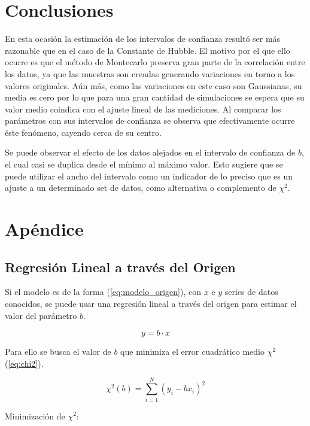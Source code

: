 \documentclass{article}
\begin{document}
\section{Conclusiones}
En esta ocasión la estimación de los intervalos de confianza resultó ser más razonable que en el caso de la Constante de Hubble. El motivo por el que ello ocurre es que el método de Montecarlo preserva gran parte de la correlación entre los datos, ya que las muestras son creadas generando variaciones en torno a los valores originales. Aún más, como las variaciones en este caso son Gaussianas, su media es cero por lo que para una gran cantidad de simulaciones se espera que su valor medio coindica con el ajuste lineal de las mediciones. Al comparar los parámetros con sus intervalos de confianza se observa que efectivamente ocurre éste fenómeno, cayendo cerca de su centro.

Se puede observar el efecto de los datos alejados en el intervalo de confianza de $b$, el cual casi se duplica desde el mínimo al máximo valor. Esto sugiere que se puede utilizar el ancho del intervalo como un indicador de lo preciso que es un ajuste a un determinado set de datos, como alternativa o complemento de $\chi ^2$.

\clearpage
\section{Apéndice}

\subsection{Regresión Lineal a través del Origen}
\label{sec:regresion}

Si el modelo es de la forma (\ref{eq:modelo_origen}), con $x$ e $y$ series de datos conocidos, se puede usar una regresión lineal a través del origen para estimar el valor del parámetro $b$.

\begin{equation}
 y = b\cdot x
 \label{eq:modelo_origen}
\end{equation}

Para ello se busca el valor de $b$ que minimiza el error cuadrático medio $\chi^2$ (\ref{eq:chi2}).

\begin{equation}
  \chi^2(b) = \sum_{i=1}^{N} (y_i - b x_i) ^ 2
  \label{eq:chi2}
\end{equation}

Minimización de $\chi^2$:
\end{document}
